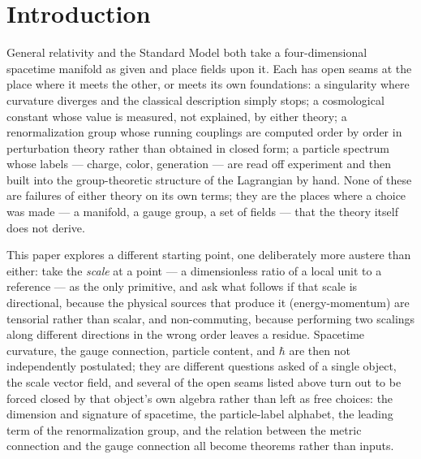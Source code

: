 \documentclass[aps,prd,twocolumn,superscriptaddress,nofootinbib]{revtex4-2}
\begin{document}
\maketitle

\section{Introduction}\label{sec:intro}

General relativity and the Standard Model both take a four-dimensional
spacetime manifold as given and place fields upon it. Each has open
seams at the place where it meets the other, or meets its own
foundations: a singularity where curvature diverges and the classical
description simply stops; a cosmological constant whose value is
measured, not explained, by either theory; a renormalization group
whose running couplings are computed order by order in perturbation
theory rather than obtained in closed form; a particle spectrum whose
labels — charge, color, generation — are read off experiment and then
built into the group-theoretic structure of the Lagrangian by hand. None
of these are failures of either theory on its own terms; they are the
places where a choice was made — a manifold, a gauge group, a set of
fields — that the theory itself does not derive.

This paper explores a different starting point, one deliberately more
austere than either: take the \emph{scale} at a point — a dimensionless
ratio of a local unit to a reference — as the only primitive, and ask
what follows if that scale is directional, because the physical sources
that produce it (energy-momentum) are tensorial rather than scalar, and
non-commuting, because performing two scalings along different
directions in the wrong order leaves a residue. Spacetime curvature, the
gauge connection, particle content, and $\hbar$ are then not
independently postulated; they are different questions asked of a single
object, the scale vector field, and several of the open seams listed
above turn out to be forced closed by that object's own algebra rather
than left as free choices: the dimension and signature of spacetime, the
particle-label alphabet, the leading term of the renormalization group,
and the relation between the metric connection and the gauge connection
all become theorems rather than inputs.
\end{document}
